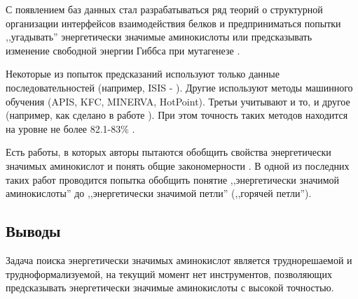 С появлением баз данных стал разрабатываться ряд теорий о структурной организации интерфейсов взаимодействия белков и предприниматься попытки ,,угадывать'' энергетически значимые аминокислоты или предсказывать изменение свободной энергии Гиббса при мутагенезе \cite{rev2}.

Некоторые из попыток предсказаний используют только данные последовательностей (например, ISIS - 
\cite{very_good}). Другие используют методы машинного обучения (APIS, KFC, MINERVA, HotPoint). Третьи учитывают и то, и другое (например, как сделано в работе \cite{hmmsvm}). При этом точность таких методов находится на уровне не более 82.1-83\% \cite{art2014,water}.


Есть  работы, в которых авторы пытаются обобщить свойства энергетически значимых аминокислот и понять общие закономерности \cite{pockets2004, orings, loops2014}. В одной из последних таких работ \cite{loops2014} проводится попытка обобщить понятие ,,энергетически значимой аминокислоты'' до ,,энергетически значимой петли'' (,,горячей петли'').

%
\subsection{Выводы}
Задача поиска энергетически значимых аминокислот является труднорешаемой и трудноформализуемой, на текущий момент нет  инструментов, позволяющих предсказывать энергетически значимые аминокислоты с высокой точностью. 

